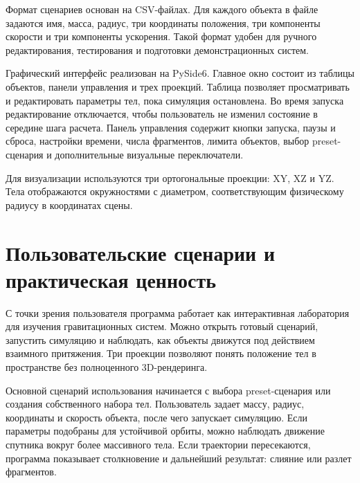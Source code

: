\documentclass[14pt,a4paper]{extarticle}
\begin{document}
	Формат сценариев основан на CSV-файлах. Для каждого объекта в файле задаются имя, масса, радиус, три координаты положения, три компоненты скорости и три компоненты ускорения. Такой формат удобен для ручного редактирования, тестирования и подготовки демонстрационных систем. %
	
	Графический интерфейс реализован на PySide6. Главное окно состоит из таблицы объектов, панели управления и трех проекций. Таблица позволяет просматривать и редактировать параметры тел, пока симуляция остановлена. Во время запуска редактирование отключается, чтобы пользователь не изменил состояние в середине шага расчета. Панель управления содержит кнопки запуска, паузы и сброса, настройки времени, числа фрагментов, лимита объектов, выбор preset-сценария и дополнительные визуальные переключатели.
	
	Для визуализации используются три ортогональные проекции: XY, XZ и YZ. Тела отображаются окружностями с диаметром, соответствующим физическому радиусу в координатах сцены.%
	
	
	\section{Пользовательские сценарии и практическая ценность}
	
	С точки зрения пользователя программа работает как интерактивная лаборатория для изучения гравитационных систем. Можно открыть готовый сценарий, запустить симуляцию и наблюдать, как объекты движутся под действием взаимного притяжения. Три проекции позволяют понять положение тел в пространстве без полноценного 3D-рендеринга.
	
	Основной сценарий использования начинается с выбора preset-сценария или создания собственного набора тел. Пользователь задает массу, радиус, координаты и скорость объекта, после чего запускает симуляцию. Если параметры подобраны для устойчивой орбиты, можно наблюдать движение спутника вокруг более массивного тела. Если траектории пересекаются, программа показывает столкновение и дальнейший результат: слияние или разлет фрагментов.
	
\end{document}
